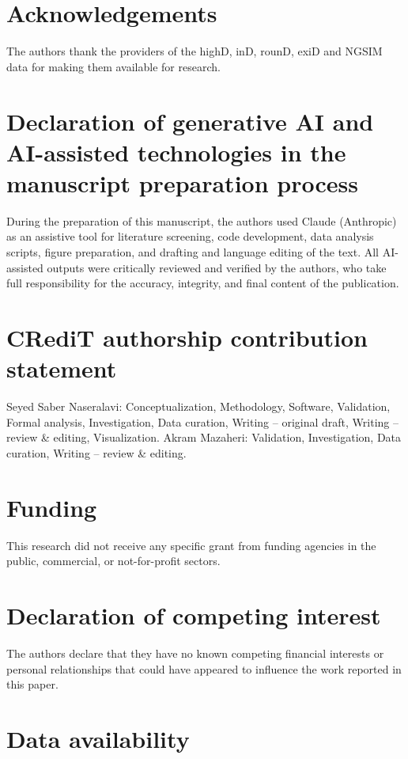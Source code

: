 \documentclass[preprint,12pt, a4paper]{elsarticle}
\begin{document}
\section*{Acknowledgements}

The authors thank the providers of the highD, inD, rounD, exiD and NGSIM data for making them available for research.

\section*{Declaration of generative AI and AI-assisted technologies in the manuscript preparation process}

During the preparation of this manuscript, the authors used Claude (Anthropic) as an assistive tool for literature screening, code development, data analysis scripts, figure preparation, and drafting and language editing of the text. All AI-assisted outputs were critically reviewed and verified by the authors, who take full responsibility for the accuracy, integrity, and final content of the publication.

\section*{CRediT authorship contribution statement}

Seyed Saber Naseralavi: Conceptualization, Methodology, Software, Validation, Formal analysis, Investigation, Data curation, Writing – original draft, Writing – review \& editing, Visualization. Akram Mazaheri: Validation, Investigation, Data curation, Writing – review \& editing.

\section*{Funding}

This research did not receive any specific grant from funding agencies in the public, commercial, or not-for-profit sectors.

\section*{Declaration of competing interest}

The authors declare that they have no known competing financial interests or personal relationships that could have appeared to influence the work reported in this paper.

\section*{Data availability}
\end{document}
